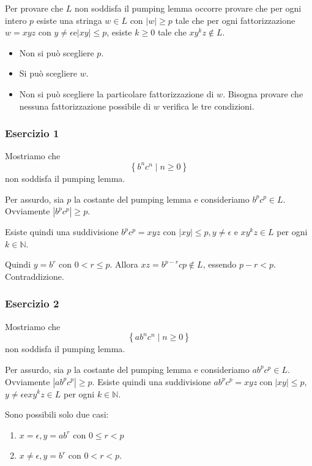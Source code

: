Per provare che $L$ non soddisfa il pumping lemma occorre provare che per ogni intero $p$ esiste una stringa $w \in L$ con $|w| \geq p$ tale che per ogni fattorizzazione $w=x y z$ con $y \neq \epsilon \mathrm{e}|x y| \leq p$, esiste $k \geq 0$ tale che $x y^{k} z \notin L$.
\begin{itemize}
    \item Non si può scegliere $p$.
    \item Si può scegliere $w$.
    \item Non si può scegliere la particolare fattorizzazione di $w$. Bisogna provare che nessuna fattorizzazione possibile di $w$ verifica le tre condizioni.
\end{itemize}

\subsubsection{Esercizio 1}

Mostriamo che
$$
\left\{b^{n} c^{n} \mid n \geq 0\right\}
$$
non soddisfa il pumping lemma.

\vspace{5mm}

Per assurdo, sia $p$ la costante del pumping lemma e consideriamo $b^{p}c^{p} \in L$. Ovviamente $\left|b^{p}c^{p}\right| \geq p$.


Esiste quindi una suddivisione $b^{p}c^{p}=x y z$ con $|x y| \leq p, y \neq \epsilon$ e $x y^{k} z \in L$ per ogni $k \in \mathbb{N}$.


Quindi $y=b^{r}$ con $0<r \leq p$.
Allora $x z=b^{p-r}c p \notin L$, essendo $p-r<p .$ Contraddizione.

\subsubsection{Esercizio 2}

Mostriamo che
$$
\left\{a b^{n} c^{n} \mid n \geq 0\right\}
$$
non soddisfa il pumping lemma.

\vspace{5mm}

Per assurdo, sia $p$ la costante del pumping lemma e consideriamo $a b^{p}c^{p} \in L$. Ovviamente $\left|a b^{p}c^{p}\right| \geq p$.
Esiste quindi una suddivisione $a b^{p}c^{p}=x y z \operatorname{con}|x y| \leq p$, $y \neq \epsilon \mathrm{e} x y^{k} z \in L$ per ogni $k \in \mathbb{N}$.

Sono possibili solo due casi:
\begin{enumerate}
    \item $x=\epsilon, y=a b^{r}$ con $0 \leq r<p$
    \item $x \neq \epsilon, y=b^{r}$ con $0<r<p$.
\end{enumerate}

